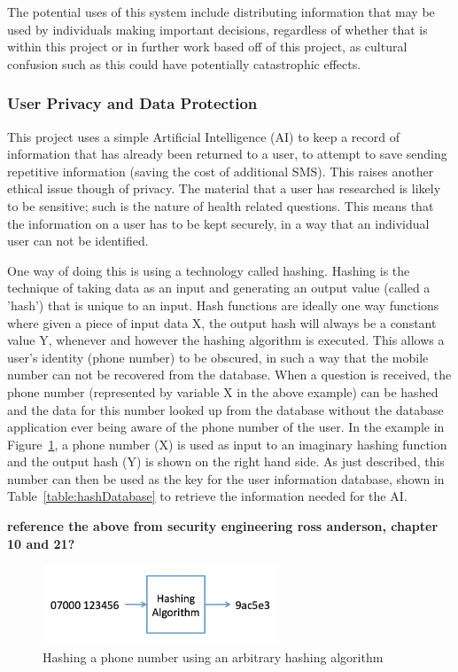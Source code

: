 \documentclass{article}
\begin{document}
The potential uses of this system include distributing information that may be used by individuals making important decisions, regardless of whether that is within this project or in further work based off of this project, as cultural confusion such as this could have potentially catastrophic effects.

\label{subsubsec:userPrivacyAndDataProtection}
\subsubsection{User Privacy and Data Protection}
This project uses a simple Artificial Intelligence (AI) to keep a record of information that has already been returned to a user, to attempt to save sending repetitive information (saving the cost of additional SMS).  This raises another ethical issue though of privacy.  The material that a user has researched is likely to be sensitive; such is the nature of health related questions.  This means that the information on a user has to be kept securely, in a way that an individual user can not be identified.

One way of doing this is using a technology called hashing.  Hashing is the technique of taking data as an input and generating an output value (called a 'hash') that is unique to an input.  Hash functions are ideally one way functions where given a piece of input data X, the output hash will always be a constant value Y, whenever and however the hashing algorithm is executed.  This allows a user's identity (phone number) to be obscured, in such a way that the mobile number can not be recovered from the database.  When a question is received, the phone number (represented by variable X in the above example) can be hashed and the data for this number looked up from the database without the database application ever being aware of the phone number of the user.  In the example in Figure~\ref{fig:hashPhoneNumber}, a phone number (X) is used as input to an imaginary hashing function and the output hash (Y) is shown on the right hand side.  As just described, this number can then be used as the key for the user information database, shown in Table~\ref{table:hashDatabase} to retrieve the information needed for the AI.

{\bf reference the above from security engineering ross anderson, chapter 10 and 21?}

\begin{figure}[htb]
    \centering
    \includegraphics[width=200pt]{hashPhoneNumber}
    \caption{Hashing a phone number using an arbitrary hashing algorithm}
    \label{fig:hashPhoneNumber}
\end{figure}
\end{document}
